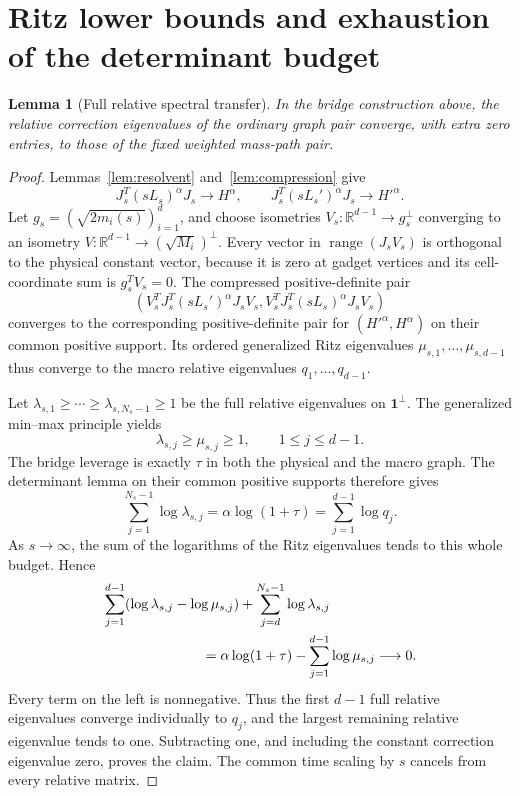 \documentclass[11pt]{article}
\newtheorem{lemma}[theorem]{Lemma}
\newcommand{\R}{\mathbb R}
\begin{document}
\section{Ritz lower bounds and exhaustion of the determinant budget}
\begin{lemma}[Full relative spectral transfer]\label{lem:transfer}
In the bridge construction above, the relative correction eigenvalues
of the ordinary graph pair converge, with extra zero entries, to
those of the fixed weighted mass-path pair.
\end{lemma}
\begin{proof}
Lemmas~\ref{lem:resolvent} and~\ref{lem:compression} give
\[
 J_s^T(sL_s)^\alpha J_s\to H^\alpha,\qquad
 J_s^T(sL_s')^\alpha J_s\to H'^\alpha.
\]
Let $g_s=(\sqrt{2m_i(s)})_{i=1}^d$, and choose isometries
$V_s:\R^{d-1}\to g_s^\perp$ converging to an isometry
$V:\R^{d-1}\to(\sqrt{M_i})^\perp$.
Every vector in $\operatorname{range}(J_sV_s)$ is orthogonal to the
physical constant vector, because it is zero at gadget vertices and
its cell-coordinate sum is $g_s^TV_s=0$.
The compressed positive-definite pair
\[
 \left(V_s^TJ_s^T(sL_s')^\alpha J_sV_s,
       V_s^TJ_s^T(sL_s)^\alpha J_sV_s\right)
\]
converges to the corresponding positive-definite pair for
$(H'^\alpha,H^\alpha)$ on their common positive support.
Its ordered generalized Ritz eigenvalues $\mu_{s,1},\ldots,
\mu_{s,d-1}$ thus converge to the macro relative eigenvalues
$q_1,\ldots,q_{d-1}$.

Let $\lambda_{s,1}\ge\cdots\ge\lambda_{s,N_s-1}\ge1$
be the full relative eigenvalues on $\mathbf1^\perp$.
The generalized min--max principle yields
\[
 \lambda_{s,j}\ge\mu_{s,j}\ge1,\qquad 1\le j\le d-1.
\]
The bridge leverage is exactly $\tau$ in both the physical and the
macro graph. The determinant lemma on their common positive supports
therefore gives
\[
 \sum_{j=1}^{N_s-1}\log\lambda_{s,j}
    =\alpha\log(1+\tau)
    =\sum_{j=1}^{d-1}\log q_j.
\]
As $s\to\infty$, the sum of the logarithms of the Ritz eigenvalues
tends to this whole budget. Hence
\begin{align*}
 &\sum_{j=1}^{d-1}(\log\lambda_{s,j}-\log\mu_{s,j})
       +\sum_{j=d}^{N_s-1}\log\lambda_{s,j}\\
 &\hspace{25mm}
   =\alpha\log(1+\tau)-\sum_{j=1}^{d-1}\log\mu_{s,j}
       \longrightarrow0.
\end{align*}
Every term on the left is nonnegative. Thus the first $d-1$ full
relative eigenvalues converge individually to $q_j$, and the largest
remaining relative eigenvalue tends to one. Subtracting one, and
including the constant correction eigenvalue zero, proves the claim.
The common time scaling by $s$ cancels from every relative matrix.
\end{proof}
\end{document}
